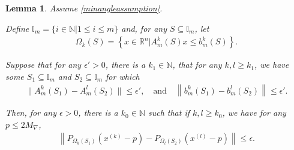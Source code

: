 \documentclass{article}
\newtheorem{lemma}[theorem]{Lemma}
\theoremstyle{case}
\numberwithin{theorem}{subsection}
\newcommand{\maxgrad}{{M_{\nabla}}}
\newcommand{\naturals}{\mathbb N}
\newcommand{\Rn}{\mathbb R^n}
\newcommand{\xk}{{x^{(k)}}}
\begin{document}
\begin{lemma}
\label{rename_2_2}
Assume \cref{minangleassumption}.

Define $\mathbb I_m = \{ i  \in \naturals | 1 \le i \le m \}$
and, for any $S \subseteq \mathbb I_m$, let
\begin{align*}
\Omega_k(S) = \left\{x\in\Rn | A^k_m\left(S\right) x \le b^k_m\left(S\right)\right\}.
\end{align*}

Suppose that for any $\epsilon' > 0$, there is a $k_1\in\naturals$, that for any $k, l \ge k_1$,
we have some
$S_1 \subseteq \mathbb I_m$ and $S_2 \subseteq \mathbb I_m$
for which
\begin{align*}
\|A^k_m\left(S_1\right) - A^l_m\left(S_2\right)\| \le \epsilon', \quad \textrm{and} \quad \left\|b^k_m\left(S_1\right) - b^l_m\left(S_2\right) \right\| \le \epsilon'.
\end{align*}


Then, for any $\epsilon > 0$, there is a $k_0\in\naturals$ such that if $k, l \ge k_0$, we have for any $p \le 2\maxgrad$,
\begin{align*}
\left\| 
  P_{\Omega_k(S_1)}\left(\xk - p\right) - P_{\Omega_l(S_2)}\left(x^{(l)} - p \right)
\right\| \le \epsilon.
\end{align*}

\end{lemma}
\end{document}
